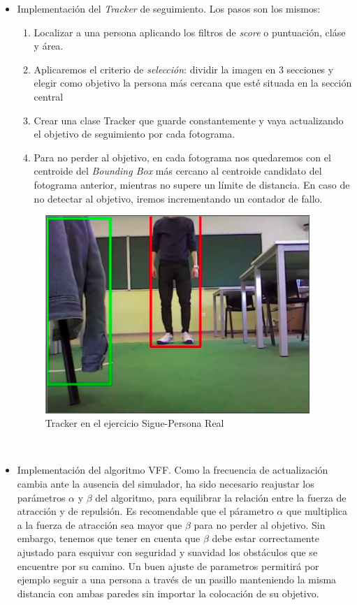 \begin{itemize}
	\item Implementación del \textit{Tracker} de seguimiento. Los pasos son los mismos:
	\begin{enumerate}
		\item Localizar a una persona aplicando los filtros de \textit{score} o puntuación, cláse y área.
		\item Aplicaremos el criterio de \textit{selección}: dividir la imagen en 3 secciones y elegir como objetivo la persona más cercana que esté situada en la sección central
		\item Crear una clase Tracker que guarde constantemente y vaya actualizando el objetivo de seguimiento por cada fotograma.
		\item Para no perder al objetivo, en cada fotograma nos quedaremos con el centroide del \textit{Bounding Box} más cercano al centroide candidato del fotograma anterior, mientras no supere un límite de distancia. En caso de no detectar al objetivo, iremos incrementando un contador de fallo.
	\end{enumerate}
	\begin{figure} [H]
		\begin{center}
			\includegraphics[width=10cm]{imagenes/cap6/tracker.png}
		\end{center}
		\caption[Tracker en el ejercicio Sigue-Persona Real]{Tracker en el ejercicio Sigue-Persona Real}
		\label{fig:tracker_real_follow_person}
	\end{figure}\
	
	\item Implementación del algoritmo VFF. Como la frecuencia de actualización cambia ante la ausencia del simulador, ha sido necesario reajustar los parámetros $\alpha$ y $\beta$ del algoritmo, para equilibrar la relación entre la fuerza de atracción y de repulsión. Es recomendable que el párametro $\alpha$ que multiplica a la fuerza de atracción sea mayor que $\beta$ para no perder al objetivo. Sin embargo, tenemos que tener en cuenta que $\beta$ debe estar correctamente ajustado para esquivar con seguridad y suavidad los obstáculos que se encuentre por su camino. Un buen ajuste de parametros permitirá por ejemplo seguir a una persona a través de un pasillo manteniendo la misma distancia con ambas paredes sin importar la colocación de su objetivo.
	

\end{itemize}
